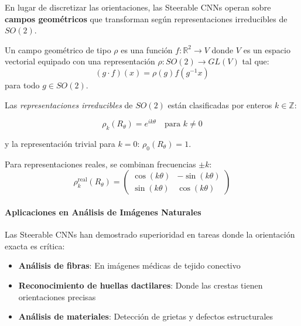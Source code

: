 En lugar de discretizar las orientaciones, las Steerable CNNs operan sobre \textbf{campos geométricos} que transforman según representaciones irreducibles de $SO(2)$.

\begin{definition}
Un campo geométrico de tipo $\rho$ es una función $f: \mathbb{R}^2 \to V$ donde $V$ es un espacio vectorial equipado con una representación $\rho: SO(2) \to GL(V)$ tal que:
\begin{equation}
(g \cdot f)(x) = \rho(g) f(g^{-1} x)
\end{equation}
para todo $g \in SO(2)$.
\end{definition}

\begin{definition}\label{def:irreps_so2}
Las \textit{representaciones irreducibles} de $SO(2)$ están clasificadas por enteros $k \in \mathbb{Z}$:

\begin{equation}
\rho_k(R_\theta) = e^{ik\theta} \quad \text{para } k \neq 0
\end{equation}

y la representación trivial para $k = 0$: $\rho_0(R_\theta) = 1$.

Para representaciones reales, se combinan frecuencias $\pm k$:
\begin{equation}
\rho_k^{\text{real}}(R_\theta) = \begin{pmatrix}
\cos(k\theta) & -\sin(k\theta) \\
\sin(k\theta) & \cos(k\theta)
\end{pmatrix}
\end{equation}
\end{definition}

\paragraph{Aplicaciones en Análisis de Imágenes Naturales}

Las Steerable CNNs han demostrado superioridad en tareas donde la orientación exacta es crítica:

\begin{itemize}
    \item \textbf{Análisis de fibras}: En imágenes médicas de tejido conectivo
    \item \textbf{Reconocimiento de huellas dactilares}: Donde las crestas tienen orientaciones precisas
    \item \textbf{Análisis de materiales}: Detección de grietas y defectos estructurales
\end{itemize}

